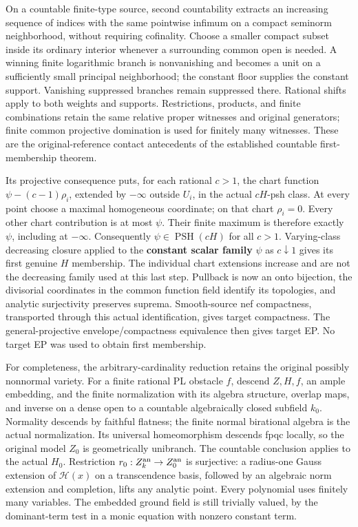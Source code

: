 \documentclass[
  10pt,
]{article}
\begin{document}
On a countable finite-type source, second countability extracts an
increasing sequence of indices with the same pointwise infimum on a
compact seminorm neighborhood, without requiring cofinality. Choose a
smaller compact subset inside its ordinary interior whenever a
surrounding common open is needed. A winning finite logarithmic branch
is nonvanishing and becomes a unit on a sufficiently small principal
neighborhood; the constant floor supplies the constant support.
Vanishing suppressed branches remain suppressed there. Rational shifts
apply to both weights and supports. Restrictions, products, and finite
combinations retain the same relative proper witnesses and original
generators; finite common projective domination is used for finitely
many witnesses. These are the original-reference contact antecedents of
the established countable first-membership theorem.

Its projective consequence puts, for each rational \(c>1\), the chart
function \(\psi-(c-1)\rho_i\), extended by \(-\infty\) outside \(U_i\),
in the actual \(cH\)-psh class. At every point choose a maximal
homogeneous coordinate; on that chart \(\rho_i=0\). Every other chart
contribution is at most \(\psi\). Their finite maximum is therefore
exactly \(\psi\), including at \(-\infty\). Consequently
\(\psi\in\operatorname{PSH}(cH)\) for all \(c>1\). Varying-class
decreasing closure applied to the \textbf{constant scalar family}
\(\psi\) as \(c\downarrow1\) gives its first genuine \(H\) membership.
The individual chart extensions increase and are not the decreasing
family used at this last step. Pullback is now an onto bijection, the
divisorial coordinates in the common function field identify its
topologies, and analytic surjectivity preserves suprema. Smooth-source
nef compactness, transported through this actual identification, gives
target compactness. The general-projective envelope/compactness
equivalence then gives target EP. No target EP was used to obtain first
membership.

For completeness, the arbitrary-cardinality reduction retains the
original possibly nonnormal variety. For a finite rational PL obstacle
\(f\), descend \(Z,H,f\), an ample embedding, and the finite
normalization with its algebra structure, overlap maps, and inverse on a
dense open to a countable algebraically closed subfield \(k_0\).
Normality descends by faithful flatness; the finite normal birational
algebra is the actual normalization. Its universal homeomorphism
descends fpqc locally, so the original model \(Z_0\) is geometrically
unibranch. The countable conclusion applies to the actual \(H_0\).
Restriction \(r_0:Z_k^{\rm an}\to Z_0^{\rm an}\) is surjective: a
radius-one Gauss extension of \(\mathcal H(x)\) on a transcendence
basis, followed by an algebraic norm extension and completion, lifts any
analytic point. Every polynomial uses finitely many variables. The
embedded ground field is still trivially valued, by the dominant-term
test in a monic equation with nonzero constant term.
\end{document}
